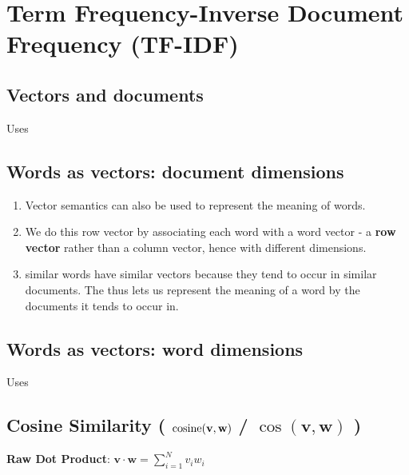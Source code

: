 \chapter{Term Frequency-Inverse Document Frequency (TF-IDF) \cite{nlp-1, ir-1}} \label{Term Frequancy-Inverse Document Frequency (TF-IDF)}


\section{Vectors and documents \cite{nlp-1}}\label{tf-idf: Vectors and documents}
Uses 


\section{Words as vectors: document dimensions \cite{nlp-1}}\label{tf-idf: Words as vectors: document dimensions}

\begin{enumerate}
    \item Vector semantics can also be used to represent the meaning of words. 

    \item We do this row vector by associating each word with a word vector - a \textbf{row vector} rather than a column vector, hence with different dimensions.

    \item similar words have similar vectors because they tend to occur in similar documents. The  thus lets us represent the meaning of a word by the documents it tends to occur in.
\end{enumerate}


\section{Words as vectors: word dimensions \cite{nlp-1}} \label{tf-idf: Words as vectors: word dimensions}

Uses 



\section{Cosine Similarity ( $\operatorname{cosine}(\mathbf{v,w})$ / $\cos(\mathbf{v,w})$ ) \cite{nlp-1}}\label{Cosine Similarity}

\textbf{Raw Dot Product}: \( \displaystyle\mathbf{v \cdot w} = \sum_{i=1}^{N} v_i w_i \)

